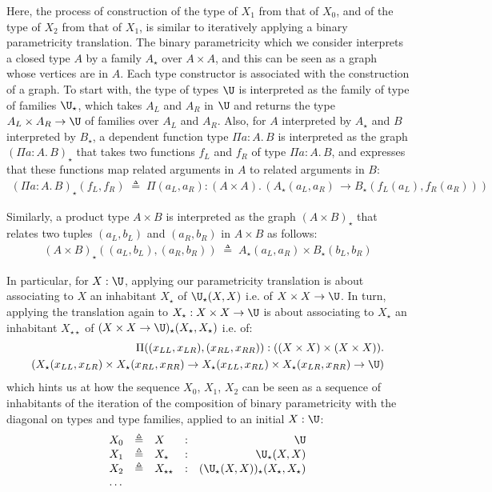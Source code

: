 \documentclass{msc}
\newcommand{\defeq}{\ensuremath{\triangleq}}
\newcommand{\kstar}{{\star}}
\begin{document}
Here, the process of construction of the type of $X_1$ from that of $X_0$, and of the type of $X_2$ from that of $X_1$, is similar to iteratively applying a binary parametricity translation. The binary parametricity which we consider interprets a closed type $A$ by a family $A_\kstar$ over $A \times A$, and this can be seen as a graph whose vertices are in $A$. Each type constructor is associated with the construction of a graph. To start with, the type of types $\U$ is interpreted as the family of type of families ${\U}_\kstar$, which takes $A_L$ and $A_R$ in $\U$ and returns the type $A_L \times A_R \rightarrow \U$ of families over $A_L$ and $A_R$. Also, for $A$ interpreted by $A_\kstar$ and $B$ interpreted by $B_\kstar$, a dependent function type $\Pi a: A.\, B$ is interpreted as the graph $(\Pi a: A.\, B)_\kstar$ that takes two functions $f_L$ and $f_R$ of type $\Pi a: A.\, B$, and expresses that these functions map related arguments in $A$ to related arguments in $B$:
\begin{align*}
  (\Pi a: A.\, B)_\kstar(f_L,f_R) \; \defeq \; \Pi (a_L,a_R): (A \times A).\, (A_\kstar(a_L,a_R)\,\rightarrow B_\kstar(f_L(a_L),f_R(a_R)))
\end{align*}

Similarly, a product type $A \times B$ is interpreted as the graph $(A \times B)_\kstar$ that relates two tuples $(a_L,b_L)$ and $(a_R,b_R)$ in $A \times B$ as follows:
\begin{align*}
  (A \times B)_\kstar((a_L,b_L),(a_R,b_R)) \; \defeq \; A_\kstar(a_L,a_R) \times B_\kstar(b_L,b_R)
\end{align*}

In particular, for $X: \U$, applying our parametricity translation is about associating to $X$ an inhabitant $X_\kstar$ of ${\U}_\kstar(X,X)$ i.e. of $X \times X \rightarrow \U$. In turn, applying the translation again to $X_\kstar: X \times X \rightarrow \U$ is about associating to $X_\kstar$ an inhabitant $X_{\kstar\kstar}$ of $(X \times X \rightarrow \U)_\kstar(X_\kstar,X_\kstar)$ i.e. of:
\begin{align*}
  \Pi ((x_{LL},x_{LR}),(x_{RL},x_{RR})): ((X \times X) \times (X \times X)). \\
  (X_\kstar(x_{LL},x_{LR}) \times X_\kstar(x_{RL},x_{RR})
  \rightarrow X_\kstar(x_{LL}, x_{RL}) \times X_\kstar(x_{LR},x_{RR})  \rightarrow \U)
\end{align*}
which hints us at how the sequence $X_0$, $X_1$, $X_2$ can be seen as a sequence of inhabitants of the iteration of the composition of binary parametricity with the diagonal on types and type families, applied to an initial $X: \U$:
\begin{equation*}
  \begin{array}{llllr}
    X_0 & \defeq & X                & : & \U                                             \\
    X_1 & \defeq & X_\kstar         & : & {\U}_\kstar(X,X)                               \\
    X_2 & \defeq & X_{\kstar\kstar} & : & ({\U}_\kstar(X,X))_{\kstar}(X_\kstar,X_\kstar) \\
    \ldots
  \end{array}
\end{equation*}
\end{document}
